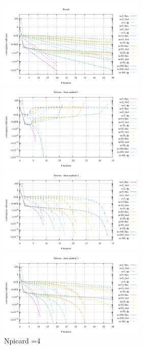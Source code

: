 \begin{center}
\includegraphics[width=7cm]{python_codes/fieldstone_87/results/experiment_10/conv_picard.pdf}
\includegraphics[width=7cm]{python_codes/fieldstone_87/results/experiment_10/conv_meth1.pdf}\\
\includegraphics[width=7cm]{python_codes/fieldstone_87/results/experiment_10/conv_meth2.pdf}
\includegraphics[width=7cm]{python_codes/fieldstone_87/results/experiment_10/conv_meth3.pdf}\\
{\captionfont Npicard =4}
\end{center}


